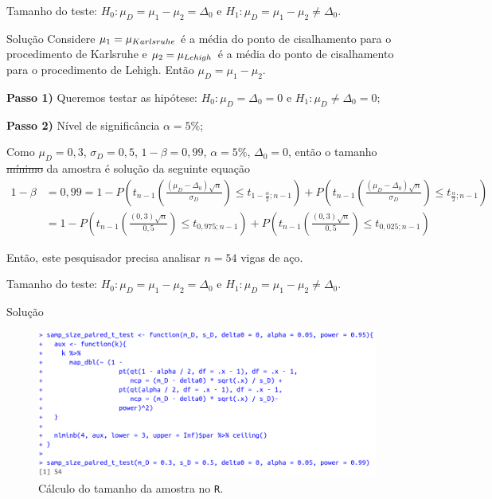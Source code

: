 \documentclass[9pt]{beamer}
\begin{document}
\begin{frame}{Tamanho do teste: $H_0:\mu_D = \mu_1 - \mu_2 = \Delta_0$ e $H_1:\mu_D =  \mu_1 - \mu_2 \neq \Delta_0$.}

\begin{block}{Solução}
Considere $\mu_1=\mu_{\tiny Karlsruhe}$ é a média do ponto de cisalhamento para o procedimento de Karlsruhe e $\mu_2 = \mu_{\tiny Lehigh}$ é a média do ponto de cisalhamento para o procedimento de Lehigh. Então $\mu_D = \mu_1 - \mu_2$.

\textbf{Passo 1)} Queremos testar as hipótese: $H_0: \mu_D = \Delta_0 = 0$ e $H_1: \mu_D \neq \Delta_0 = 0$;

\textbf{Passo 2)} Nível de significância $\alpha=5\%$;

Como $\mu_D = 0,3$, $\sigma_D = 0,5$, $1-\beta=0,99$, $\alpha=5\%$, $\Delta_0=0$, então o tamanho \sout{mínimo} da amostra é solução da seguinte equação
{\scriptsize
\begin{align*}
1-\beta &= 0,99= 1 - P\left( t_{n-1}\left( \frac{(\mu_D - \Delta_0)\sqrt{n}}{\sigma_D} \right) \leq t_{1-\frac{\alpha}{2};n-1} \right) + P\left( t_{n-1}\left( \frac{(\mu_D - \Delta_0)\sqrt{n}}{\sigma_D} \right) \leq t_{\frac{\alpha}{2};n-1} \right)\\
&= 1 - P\left( t_{n-1}\left( \frac{(0,3)\sqrt{n}}{0,5} \right) \leq t_{0,975;n-1} \right) + P\left( t_{n-1}\left( \frac{(0,3)\sqrt{n}}{0,5} \right) \leq t_{0,025;n-1} \right)
\end{align*}
}

Então, este pesquisador precisa analisar $n=54$ vigas de aço.
\end{block}
\end{frame}

\begin{frame}{Tamanho do teste: $H_0:\mu_D = \mu_1 - \mu_2 = \Delta_0$ e $H_1:\mu_D =  \mu_1 - \mu_2 \neq \Delta_0$.}

\normalsize

\begin{block}{Solução}
	\begin{figure}[htbp]
		\centering
		\includegraphics[width=\linewidth]{figures/samp-size-paired-t-test-bilateral.png}
		\caption{Cálculo do tamanho da amostra no \texttt{R}.}
	\end{figure}
	
\end{block}
\end{frame}
\end{document}
